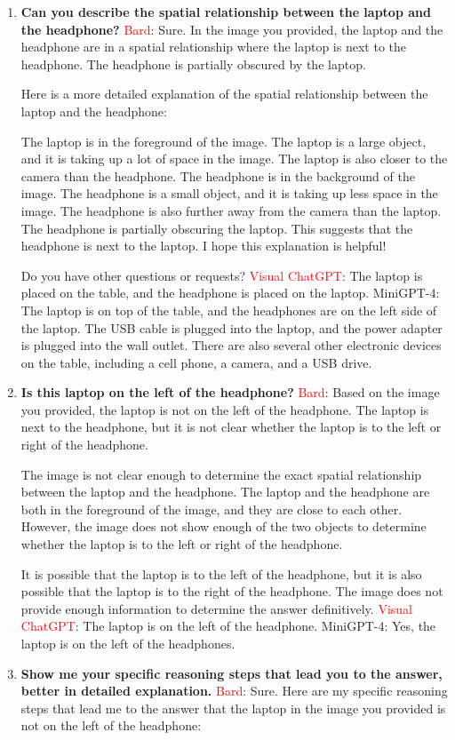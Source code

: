 \begin{enumerate}
    \item \textbf{Can you describe the spatial relationship between the laptop and the headphone?}
    \subitem \textcolor{Red}{Bard}: 
    Sure. In the image you provided, the laptop and the headphone are in a spatial relationship where the laptop is next to the headphone. The headphone is partially obscured by the laptop.

    Here is a more detailed explanation of the spatial relationship between the laptop and the headphone:

    The laptop is in the foreground of the image. The laptop is a large object, and it is taking up a lot of space in the image. The laptop is also closer to the camera than the headphone.
    The headphone is in the background of the image. The headphone is a small object, and it is taking up less space in the image. The headphone is also further away from the camera than the laptop.
    The headphone is partially obscuring the laptop. This suggests that the headphone is next to the laptop.
    I hope this explanation is helpful!

    Do you have other questions or requests?
    \subitem \textcolor{red}{Visual ChatGPT}: The laptop is placed on the table, and the headphone is placed on the laptop.
    \subitem MiniGPT-4: The laptop is on top of the table, and the headphones are on the left side of the laptop. The USB cable is plugged into the laptop, and the power adapter is plugged into the wall outlet. There are also several other electronic devices on the table, including a cell phone, a camera, and a USB drive.
    \item \textbf{Is this laptop on the left of the headphone?}
    \subitem \textcolor{Red}{Bard}: 
    Based on the image you provided, the laptop is not on the left of the headphone. The laptop is next to the headphone, but it is not clear whether the laptop is to the left or right of the headphone.
    
    The image is not clear enough to determine the exact spatial relationship between the laptop and the headphone. The laptop and the headphone are both in the foreground of the image, and they are close to each other. However, the image does not show enough of the two objects to determine whether the laptop is to the left or right of the headphone.
    
    It is possible that the laptop is to the left of the headphone, but it is also possible that the laptop is to the right of the headphone. The image does not provide enough information to determine the answer definitively.
    \subitem \textcolor{red}{Visual ChatGPT}: The laptop is on the left of the headphone.
    \subitem MiniGPT-4: Yes, the laptop is on the left of the headphones.
    \item \textbf{Show me your specific reasoning steps that lead you to the answer, better in detailed explanation.}
    \subitem \textcolor{Red}{Bard}: 
    Sure. Here are my specific reasoning steps that lead me to the answer that the laptop in the image you provided is not on the left of the headphone:
    

\end{enumerate}
